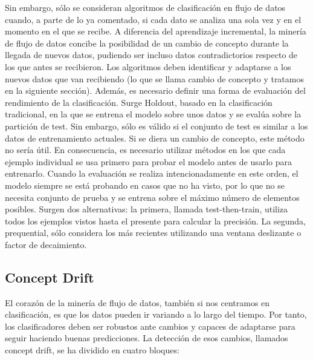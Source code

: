 Sin embargo, sólo se consideran algoritmos de clasificación en flujo de datos cuando, a parte de lo ya comentado, si cada dato se analiza una sola vez y en el momento en el que se recibe. A diferencia del aprendizaje incremental, la minería de flujo de datos concibe la posibilidad de un cambio de concepto durante la llegada de nuevos datos, pudiendo ser incluso datos contradictorios respecto de los que antes se recibieron. Los algoritmos deben identificar y adaptarse a los nuevos datos que van recibiendo (lo que se llama cambio de concepto y tratamos en la siguiente sección). Además, es necesario definir una forma de evaluación del rendimiento de la clasificación. Surge Holdout, basado en la clasificación tradicional, en la que se entrena el modelo sobre unos datos y se evalúa sobre la partición de test. Sin embargo, sólo es válido si el conjunto de test es similar a los datos de entrenamiento actuales. Si se diera un cambio de concepto, este método no sería útil. En consecuencia, es necesario utilizar métodos en los que cada ejemplo individual se usa primero para probar el modelo antes de usarlo para entrenarlo. Cuando la evaluación se realiza intencionadamente en este orden, el modelo siempre se está probando en casos que no ha visto, por lo que no se necesita conjunto de prueba y se entrena sobre el máximo número de elementos posibles. Surgen dos alternativas: la primera, llamada test-then-train, utiliza todos los ejemplos vistos hasta el presente para calcular la precisión. La segunda, prequential, sólo considera los más recientes utilizando una ventana deslizante o factor de decaimiento.  


\subsection{Concept Drift}

El corazón de la minería de flujo de datos, también si nos centramos en clasificación, es que los datos pueden ir variando a lo largo del tiempo. Por tanto, los clasificadores deben ser robustos ante cambios y capaces de adaptarse para seguir haciendo buenas predicciones. La detección de esos cambios, llamados concept drift, se ha dividido en cuatro bloques:

